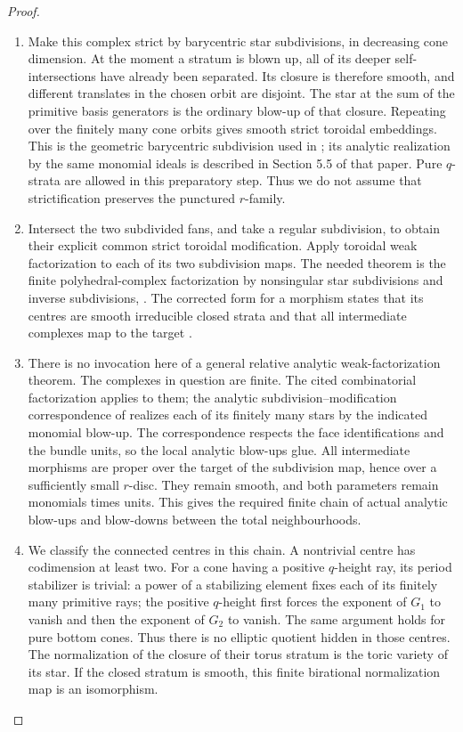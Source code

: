 \begin{proof}
\begin{enumerate}[label=\arabic*.,leftmargin=*]
\item Make this complex strict by barycentric star subdivisions,
in decreasing cone dimension. At the moment a stratum
is blown up, all of its deeper self-intersections have
already been separated. Its closure is therefore smooth,
and different translates in the chosen orbit are disjoint.
The star at the sum of the primitive basis generators is
the ordinary blow-up of that closure. Repeating over the
finitely many cone orbits gives smooth strict toroidal
embeddings. This is the geometric barycentric subdivision
used in \cite[Section 5.6, pp.565--566]{AKMW02AB}; its
analytic realization by the same monomial ideals is
described in Section 5.5 of that paper. Pure $q$-strata
are allowed in this preparatory step. Thus we do not
assume that strictification preserves the punctured
$r$-family.

\item Intersect the two subdivided fans, and take a regular
subdivision, to obtain their explicit common strict
toroidal modification. Apply toroidal weak factorization
to each of its two subdivision maps. The needed theorem
is the finite polyhedral-complex factorization by
nonsingular star subdivisions and inverse subdivisions,
\cite[Theorems 1.6.1 and 2.7.1]{AKMW02AB}. The corrected
form for a morphism states that its centres are smooth
irreducible closed strata and that all intermediate
complexes map to the target
\cite[Section 2, p.2]{Matsuki00ErrAB}.

\item There is no invocation here of a general relative
analytic weak-factorization theorem. The complexes in
question are finite. The cited combinatorial
factorization applies to them; the analytic
subdivision--modification correspondence of
\cite[Section 5.5]{AKMW02AB} realizes each of its finitely
many stars by the indicated monomial blow-up.
The correspondence respects the face identifications
and the bundle units, so the local analytic blow-ups
glue. All intermediate morphisms are proper over the
target of the subdivision map, hence over a sufficiently
small $r$-disc. They remain smooth, and both parameters
remain monomials times units. This gives the required
finite chain of actual analytic blow-ups and blow-downs
between the total neighbourhoods.

\item We classify the connected centres in this chain. A
nontrivial centre has codimension at least two. For a
cone having a positive $q$-height ray, its period
stabilizer is trivial: a power of a stabilizing element
fixes each of its finitely many primitive rays; the
positive $q$-height first forces the exponent of $G_1$
to vanish and then the exponent of $G_2$ to vanish.
The same argument holds for pure bottom cones. Thus
there is no elliptic quotient hidden in those centres.
The normalization of the closure of their torus stratum
is the toric variety of its star. If the closed stratum
is smooth, this finite birational normalization map is
an isomorphism.


\end{enumerate}
\end{proof}
